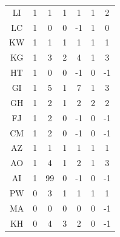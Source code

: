 {\begin{table}[ht]
\begin{adjustbox}{width=\textwidth}
\begin{tabular}{c|cc|cc|cc}
                LI & 1 & 1 & 1 & 1 & 1 & 2\\
                LC & 1 & 0 & 0 & -1 & 1 & 0\\
                KW & 1 & 1 & 1 & 1 & 1 & 1\\
                KG & 1 & 3 & 2 & 4 & 1 & 3\\
                HT & 1 & 0 & 0 & -1 & 0 & -1\\
                GI & 1 & 5 & 1 & 7 & 1 & 3\\
                GH & 1 & 2 & 1 & 2 & 2 & 2\\
                FJ & 1 & 2 & 0 & -1 & 0 & -1\\
                CM & 1 & 2 & 0 & -1 & 0 & -1\\
                AZ & 1 & 1 & 1 & 1 & 1 & 1\\
                AO & 1 & 4 & 1 & 2 & 1 & 3\\
                AI & 1 & 99 & 0 & -1 & 0 & -1\\
                PW & 0 & 3 & 1 & 1 & 1 & 1\\
                MA & 0 & 0 & 0 & 0 & 0 & -1\\
                KH & 0 & 4 & 3 & 2 & 0 & -1\\
                \bottomrule
            \end{tabular}
        \end{adjustbox}
    \end{table}
}



